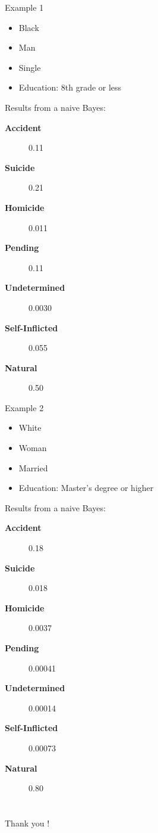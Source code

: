 \documentclass[xcolor=table]{beamer}
\begin{document}
\begin{frame}{Example 1}
  \begin{itemize}
    \item Black
    \item Man
    \item Single
    \item Education: 8th grade or less
  \end{itemize}
  
  Results from a naive Bayes:
  \begin{description}
    \item [\textbf{Accident}] 0.11
    \item [\textbf{Suicide}] 0.21
    \item [\textbf{Homicide}] 0.011
    \item [\textbf{Pending}] 0.11
    \item [\textbf{Undetermined}] 0.0030
    \item [\textbf{Self-Inflicted}] 0.055
    \item [\textbf{Natural}] 0.50
  \end{description}
\end{frame}

\begin{frame}{Example 2}
  \begin{itemize}
    \item White
    \item Woman
    \item Married
    \item Education: Master's degree or higher
  \end{itemize}
  
  Results from a naive Bayes:
  \begin{description}
    \item [\textbf{Accident}] 0.18
    \item [\textbf{Suicide}] 0.018
    \item [\textbf{Homicide}] 0.0037
    \item [\textbf{Pending}] 0.00041
    \item [\textbf{Undetermined}] 0.00014
    \item [\textbf{Self-Inflicted}] 0.00073
    \item [\textbf{Natural}] 0.80
  \end{description}
\end{frame}

\section*{}
\begin{frame}
  \begin{center}
  \LARGE 
  Thank you !
  \end{center}
\end{frame}
	
\end{document}
